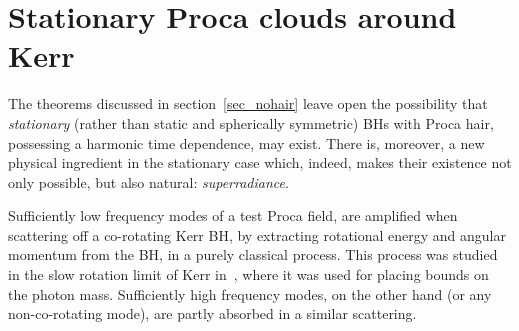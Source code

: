%
%
%
%
%
%
%
%  
%

\section{Stationary Proca clouds around Kerr}
\label{sec_clouds}
The theorems discussed in section~\ref{sec_nohair} leave open the possibility that \textit{stationary} (rather than static and spherically symmetric) BHs with Proca hair, possessing a harmonic time dependence, may exist. There is, moreover, a new physical ingredient in the stationary case which, indeed, makes their existence not only possible, but also natural: \textit{superradiance}. 

Sufficiently low frequency modes of a test Proca field, are amplified when scattering off a co-rotating Kerr BH, by extracting rotational energy and angular momentum from the BH, in a purely classical process. This process was studied in the slow rotation limit of Kerr in~\cite{Pani:2012vp,Pani:2012bp}, where it was used for placing bounds on the photon mass. Sufficiently high frequency modes, on the other hand (or any non-co-rotating mode), are partly absorbed in a similar scattering. 


